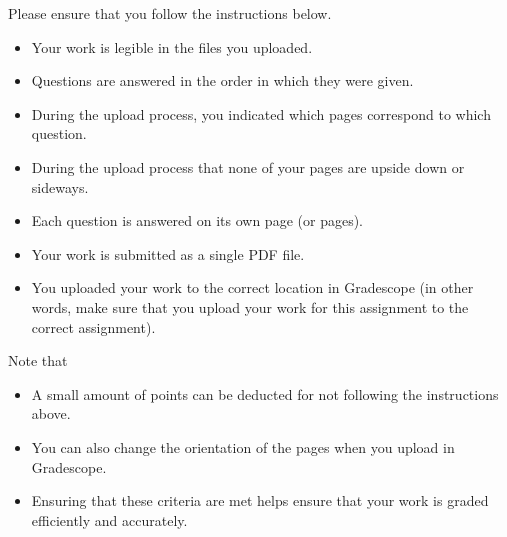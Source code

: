 \documentclass[11pt]{exam}
\begin{document}
\begin{questions}
\end{questions}
\noindent Please ensure that you follow the instructions below.
\begin{itemize}
\item Your work is legible in the files you uploaded.
\item Questions are answered in the order in which they were given.
\item During the upload process, you indicated which pages correspond to which
question.
\item During the upload process that none of your pages are upside down or
sideways.
\item Each question is answered on its own page (or pages).
\item Your work is submitted as a single PDF file.
\item You uploaded your work to the correct location in Gradescope (in other
words, make sure that you upload your work for this assignment to the correct
assignment).
\end{itemize}
\noindent Note that
\begin{itemize}
\item A small amount of points can be deducted for not following the
instructions above.
\item You can also change the orientation of the pages when you upload in
Gradescope.
\item Ensuring that these criteria are met helps ensure that your work is
graded efficiently and accurately.
\end{itemize}
\end{document}
